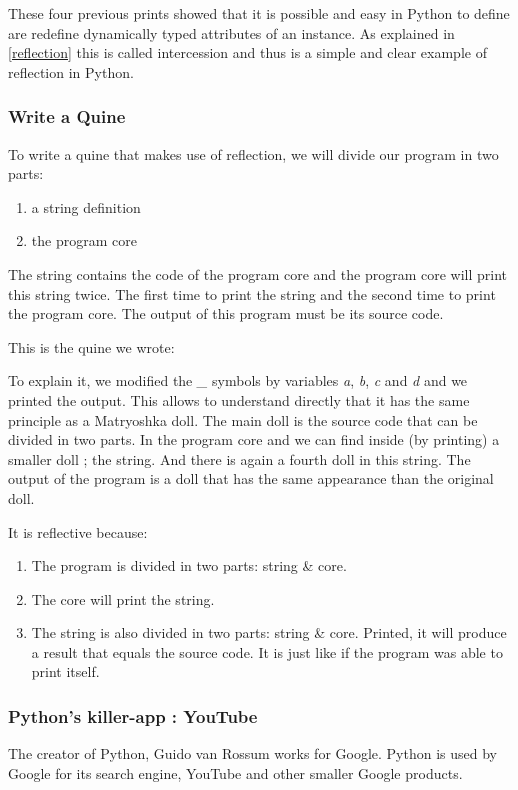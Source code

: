 These four previous prints showed that it is possible and easy in Python to define are redefine dynamically typed attributes of an instance. As explained in \ref{reflection} this is called intercession and thus is a  simple and clear example of reflection in Python.\\

\subsubsection{Write a Quine}
To write a quine that makes use of reflection, we will divide our program in two parts:
\begin{enumerate}
    \item a string definition
    \item the program core
\end{enumerate}
The string contains the code of the program core and the program core will print this string twice. The first time to print the string and the second time to print the program core. The output of this program must be its source code.

This is the quine we wrote:


To explain it, we modified the \emph{\_} symbols by variables \emph{a}, \emph{b}, \emph{c} and \emph{d} and we printed the output. This allows to understand directly that it has the same principle as a Matryoshka doll. The main doll is the source code that can be divided in two parts. In the program core and we can find inside (by printing) a smaller doll ; the string. And there is again a fourth doll in this string. The output of the program is a doll that has the same appearance than the original doll.


It is reflective because:
\begin{enumerate}
    \item The program is divided in two parts: string \& core.
    \item The core will print the string.
    \item The string is also divided in two parts: string \& core. Printed, it will produce a result that equals the source code. It is just like if the program was able to print itself. 
\end{enumerate}

\subsubsection{Python's killer-app : YouTube}
The creator of Python, Guido van Rossum works for Google. Python is used by Google for its search engine, YouTube and other smaller Google products.\\

